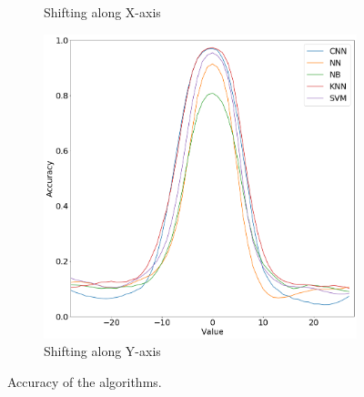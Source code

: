 \begin{figure}[htb!]
\begin{subfigure}[b]{0.3\textwidth}
        \caption{Shifting along X-axis}
    \end{subfigure}
    \begin{subfigure}[b]{0.3\textwidth}
        \centering
        \includegraphics[width=\textwidth]{chapters/results/MT/ShiftY.png}
        \caption{Shifting along Y-axis}
    \end{subfigure}
    \caption{Accuracy of the algorithms.}
    \label{fig:Accuracy}
    \end{figure}

